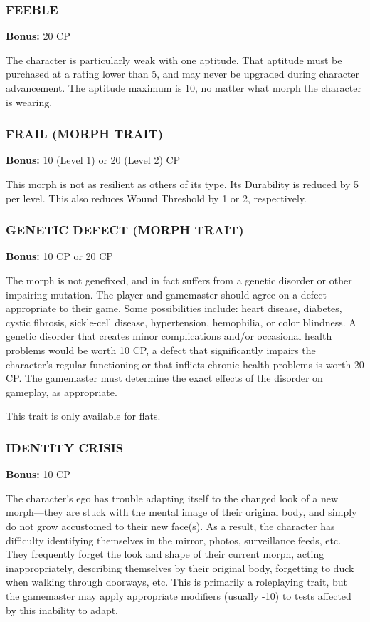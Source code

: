 \subsubsection{FEEBLE}
\textbf{Bonus:} 20 CP

The character is particularly weak with one aptitude.  That aptitude must be
purchased at a rating lower than 5, and may never be upgraded during character
advancement. The aptitude maximum is 10, no matter what morph the character is
wearing.

\subsubsection{FRAIL (MORPH TRAIT)}
\textbf{Bonus:} 10 (Level 1) or 20 (Level 2) CP

This morph is not as resilient as others of its type.  Its Durability is
reduced by 5 per level. This also reduces Wound Threshold by 1 or 2,
respectively.

\subsubsection{GENETIC DEFECT (MORPH TRAIT)}
\textbf{Bonus:} 10 CP or 20 CP

The morph is not genefixed, and in fact suffers from a genetic disorder or
other impairing mutation.  The player and gamemaster should agree on a defect
appropriate to their game. Some possibilities include: heart disease, diabetes,
cystic fibrosis, sickle-cell disease, hypertension, hemophilia, or color
blindness.  A genetic disorder that creates minor complications and/or
occasional health problems would be worth 10 CP, a defect that significantly
impairs the character’s regular functioning or that inflicts chronic health
problems is worth 20 CP. The gamemaster must determine the exact effects of
the disorder on gameplay, as appropriate.

This trait is only available for flats.

\subsubsection{IDENTITY CRISIS}
\textbf{Bonus:} 10 CP

The character’s ego has trouble adapting itself to the changed look of a new
morph—they are stuck with the mental image of their original body, and simply
do not grow accustomed to their new face(s).  As a result, the character has
difficulty identifying themselves in the mirror, photos, surveillance feeds,
etc. They frequently forget the look and shape of their current morph, acting
inappropriately, describing themselves by their original body, forgetting to
duck when walking through doorways, etc. This is primarily a roleplaying
trait, but the gamemaster may apply appropriate modifiers (usually -10) to
tests affected by this inability to adapt.

